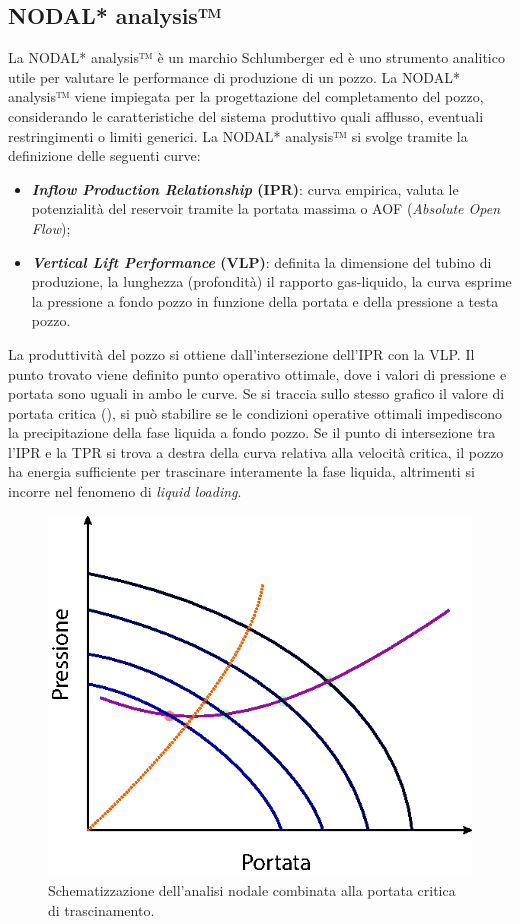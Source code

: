 \subsection{NODAL* analysis™}
La NODAL* analysis™ è un marchio Schlumberger ed è uno strumento analitico utile per valutare le performance di produzione di un pozzo. La NODAL* analysis™ viene impiegata per la progettazione del completamento del pozzo, considerando le caratteristiche del sistema produttivo quali afflusso, eventuali restringimenti o limiti generici. La NODAL* analysis™ si svolge tramite la definizione delle seguenti curve:
\begin{itemize}
    \item \textbf{\textit{Inflow Production Relationship} (IPR)}: curva empirica, valuta le potenzialità del reservoir tramite la portata massima o AOF (\textit{Absolute Open Flow});
    \item \textbf{\textit{Vertical Lift Performance} (VLP)}: definita la dimensione del tubino di produzione, la lunghezza (profondità) il rapporto gas-liquido, la curva esprime la pressione a fondo pozzo in funzione della portata e della pressione a testa pozzo. 
\end{itemize}
La produttività del pozzo si ottiene dall'intersezione dell'IPR con la VLP. Il punto trovato viene definito punto operativo ottimale, dove i valori di pressione e portata sono uguali in ambo le curve. Se si traccia sullo stesso grafico il valore di portata critica (), si può stabilire se le condizioni operative ottimali impediscono la precipitazione della fase liquida a fondo pozzo. Se il punto di intersezione tra l'IPR e la TPR si trova a destra della curva relativa alla velocità critica, il pozzo ha energia sufficiente per trascinare interamente la fase liquida, altrimenti si incorre nel fenomeno di \textit{liquid loading}.

\begin{figure}[htbp]
    \centering
    \includegraphics[width=.5\textwidth]{fig/foamer/ipr-tpr.eps}
    \caption{Schematizzazione dell'analisi nodale combinata alla portata critica di trascinamento.}
    \label{fig:ipr-tpr}
\end{figure}


